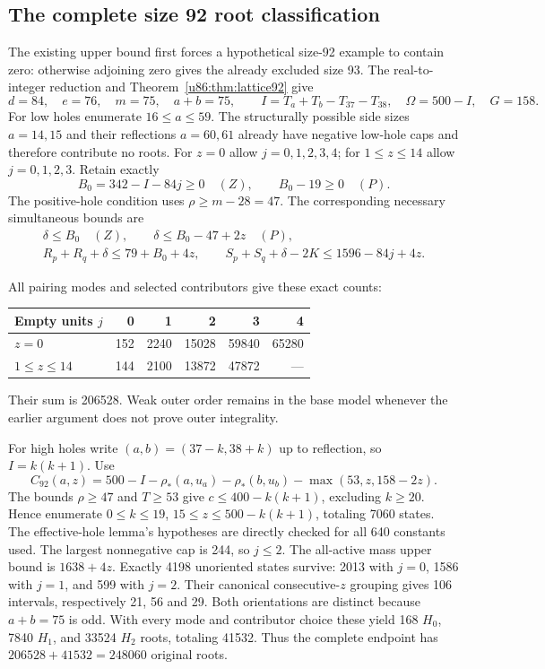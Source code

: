 \documentclass[11pt,a4paper]{article}
\theoremstyle{remark}
\begin{document}
\subsection{The complete size 92 root classification}
The existing upper bound first forces a hypothetical size-92 example to
contain zero: otherwise adjoining zero gives the already excluded size
93. The real-to-integer reduction and Theorem~\ref{u86:thm:lattice92} give
\[
 d=84,\quad e=76,\quad m=75,\quad a+b=75,\qquad
 I=T_a+T_b-T_{37}-T_{38},\quad\Omega=500-I,\quad G=158.
\]
For low holes enumerate $16\le a\le59$. The structurally possible
side sizes $a=14,15$ and their reflections $a=60,61$ already have
negative low-hole caps and therefore contribute no roots. For $z=0$
allow $j=0,1,2,3,4$;
for $1\le z\le14$ allow $j=0,1,2,3$. Retain exactly
\[
 B_0=342-I-84j\ge0\quad(Z),\qquad B_0-19\ge0\quad(P).
\]
The positive-hole condition uses $\rho\ge m-28=47$. The corresponding
necessary simultaneous bounds are
\begin{gather*}
 \delta\le B_0\quad(Z),\qquad
 \delta\le B_0-47+2z\quad(P),\\
 R_p+R_q+\delta\le79+B_0+4z,\qquad
 S_p+S_q+\delta-2K\le1596-84j+4z.
\end{gather*}
\begin{samepage}
All pairing modes and selected contributors give these exact counts:
\begin{center}\small
\begin{tabular}{lrrrrr}
\toprule
Empty units $j$&0&1&2&3&4\\\midrule
$z=0$&152&2240&15028&59840&65280\\
$1\le z\le14$&144&2100&13872&47872&---\\\bottomrule
\end{tabular}
\end{center}
\end{samepage}
Their sum is 206528. Weak outer order remains in the base model whenever
the earlier argument does not prove outer integrality.

For high holes write $(a,b)=(37-k,38+k)$ up to reflection, so
$I=k(k+1)$. Use
\[
 C_{92}(a,z)=500-I-\rho_*(a,u_a)-\rho_*(b,u_b)
                  -\max(53,z,158-2z).
\]
The bounds $\rho\ge47$ and $T\ge53$ give
$c\le400-k(k+1)$, excluding $k\ge20$. Hence enumerate
$0\le k\le19$, $15\le z\le500-k(k+1)$, totaling 7060 states.
The effective-hole lemma's hypotheses are directly checked for all
640 constants used. The largest nonnegative cap is 244, so $j\le2$.
The all-active mass upper bound is $1638+4z$.
Exactly 4198 unoriented states survive: 2013 with $j=0$, 1586 with $j=1$,
and 599 with $j=2$. Their canonical consecutive-$z$ grouping gives
106 intervals, respectively 21, 56 and 29. Both orientations are distinct
because $a+b=75$ is odd. With every mode and contributor choice these
yield 168 $H_0$, 7840 $H_1$, and 33524 $H_2$ roots, totaling 41532.
Thus the complete endpoint has $206528+41532=248060$ original roots.
\end{document}
